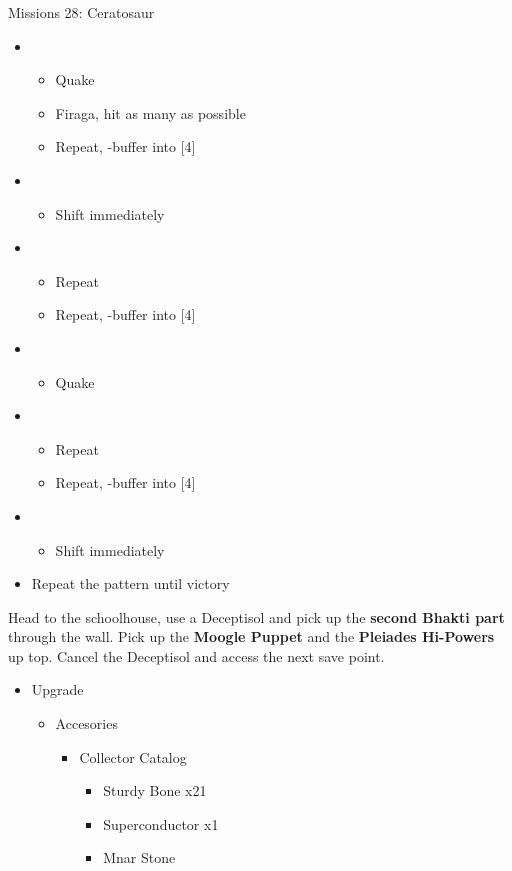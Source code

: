 \begin{battle}{Missions 28: Ceratosaur}
	\begin{itemize}
		\item \third
			\begin{itemize}
				\item Quake
				\item Firaga, hit as many as possible
				\item Repeat, \com-buffer into [4]
			\end{itemize}
		\item \fourth
			\begin{itemize}
				\item Shift immediately
			\end{itemize}
		\item \third
			\begin{itemize}
				\item Repeat
				\item Repeat, \com-buffer into [4]
			\end{itemize}
		\item \fourth
			\begin{itemize}
				\item Quake
			\end{itemize}
		\item \third
			\begin{itemize}
				\item Repeat
				\item Repeat, \com-buffer into [4]
			\end{itemize}
		\item \fourth
			\begin{itemize}
				\item Shift immediately
			\end{itemize}
		\item Repeat the pattern until victory		
	\end{itemize}
\end{battle}

Head to the schoolhouse, use a Deceptisol and pick up the \textbf{second Bhakti part} through the wall.
Pick up the \textbf{Moogle Puppet} and the \textbf{Pleiades Hi-Powers} up top.
Cancel the Deceptisol and access the next save point.

\begin{upgrade}
	\begin{itemize}
		\item Upgrade
			\begin{itemize}
				\item Accesories
					\begin{itemize}
						\item Collector Catalog
							\begin{itemize}
								\item Sturdy Bone x21
								\item Superconductor x1
								\item Mnar Stone
							\end{itemize}
					\end{itemize}
			\end{itemize}
	\end{itemize}
\end{upgrade}
\vfill

